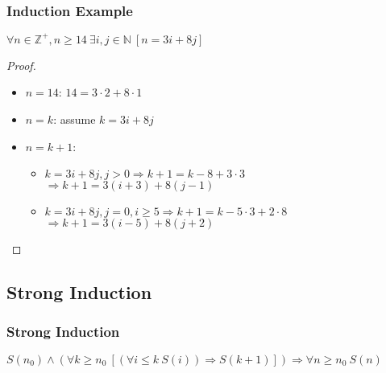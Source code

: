 \documentclass[dvipsnames]{beamer}
\begin{document}
\begin{frame}
  \frametitle{Induction Example}

  \begin{theorem}
    $\forall n \in \mathbb{Z}^+, n \geq 14~\exists i,j \in \mathbb{N}~[n=3i+8j]$
  \end{theorem}

  \pause
  \begin{proof}
    \begin{itemize}
      \item $n=14$: $14=3 \cdot 2 + 8 \cdot 1$

      \pause
      \item $n=k$: assume $k=3i+8j$

      \pause
      \item $n=k+1$:
      \begin{itemize}
        \item $k=3i+8j, j>0 \Rightarrow k+1=k-8+3 \cdot 3$\\
          $\Rightarrow k+1=3(i+3)+8(j-1)$
        \item $k=3i+8j, j=0, i \geq 5 \Rightarrow k+1=k-5 \cdot 3+2 \cdot 8$\\
          $\Rightarrow k+1=3(i-5)+8(j+2)$
      \end{itemize}
    \end{itemize}
  \end{proof}
\end{frame}

\subsection{Strong Induction}

\begin{frame}
  \frametitle{Strong Induction}

  \begin{definition}
    $S(n_0) \wedge
      (\forall k \geq n_0~[(\forall i \leq k~S(i)) \Rightarrow S(k+1)])
      \Rightarrow \forall n \geq n_0~S(n)$
  \end{definition}
\end{frame}
\end{document}
